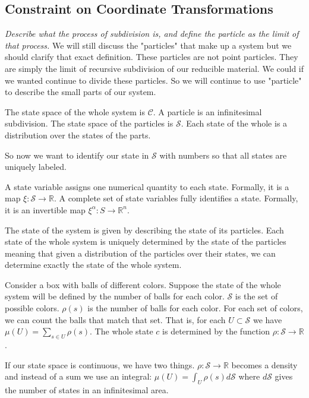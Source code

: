 \documentclass{article}
\begin{document}
\subsection{Constraint on Coordinate Transformations}

	\emph{Describe what the process of subdivision is, and define the particle as the limit of that process.} We will still discuss the "particles" that make up a system but we should clarify that exact definition. These particles are not point particles. They are simply the limit of recursive subdivision of our reducible material. We could if we wanted continue to divide these particles. So we will continue to use "particle" to describe the small parts of our system.

\begin{defn}
	The state space of the whole system is $\mathcal{C}$. A particle is an infinitesimal subdivision. The state space of the particles is $\mathcal{S}$. Each state of the whole is a distribution over the states of the parts.
\end{defn}

	So now we want to identify our state in $\mathcal{S}$ with numbers so that all states are uniquely labeled.

\begin{defn}
	A state variable assigns one numerical quantity to each state. Formally, it is a map $\xi : \mathcal{S} \to \mathbb{R}$. A complete set of state variables fully identifies a state. Formally, it is an invertible  map $\xi^\alpha : S \rightarrow \mathbb{R}^n $.
\end{defn}

	The state of the system is given by describing the state of its particles. Each state of the whole system is uniquely determined by the state of the particles meaning that given a distribution of the particles over their states, we can determine exactly the state of the whole system.
	
	Consider a box with balls of different colors. Suppose the state of the whole system will be defined by the number of balls for each color. $\mathcal{S}$ is the set of possible colors. $\rho(s)$ is the number of balls for each color. For each set of colors, we can count the balls that match that set. That is, for each $U \subset \mathcal{S}$ we have $\mu(U) = \sum_{s \in U} \rho(s)$. The whole state $c$ is determined by the function $\rho : \mathcal{S} \to \mathbb{R}$.

	If our state space is continuous, we have two things. $\rho : \mathcal{S} \to \mathbb{R}$ becomes a density and instead of a sum we use an integral: $\mu(U) = \int_{U} \rho(s) d\mathcal{S}$ where $d\mathcal{S}$ gives the number of states in an infinitesimal area.
\end{document}
